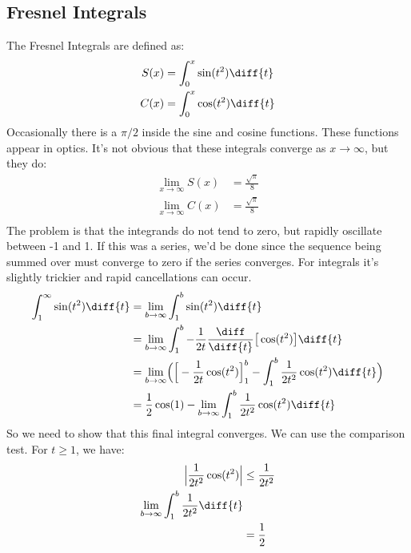         \subsection{Fresnel Integrals}
            The Fresnel Integrals are defined as:
            \begin{align}
                S(x)&=\int_{0}^{x}\sin(t^{2})\diff{t}\\
                C(x)&=\int_{0}^{x}\cos(t^{2})\diff{t}
            \end{align}
            Occasionally there is a $\pi/2$ inside the sine and
            cosine functions. These functions appear in optics.
            It's not obvious that these integrals converge as
            $x\rightarrow\infty$, but they do:
            \begin{align}
                \underset{x\rightarrow\infty}{\lim}S(x)
                &=\frac{\sqrt{\pi}}{8}\\
                \underset{x\rightarrow\infty}{\lim}C(x)
                &=\frac{\sqrt{\pi}}{8}\\
            \end{align}
            The problem is that the integrands do not tend to
            zero, but rapidly oscillate between -1 and 1. If this
            was a series, we'd be done since the sequence being
            summed over must converge to zero if the series
            converges. For integrals it's slightly trickier and
            rapid cancellations can occur.
            \begin{align}
                \int_{1}^{\infty}\sin(t^{2})\diff{t}
                &=\underset{b\rightarrow\infty}{\lim}
                \int_{1}^{b}\sin(t^{2})\diff{t}\\
                &=\underset{b\rightarrow\infty}{\lim}
                \int_{1}^{b}-\frac{1}{2t}\frac{\diff}{\diff{t}}
                \big[\cos(t^{2})\big]\diff{t}\\
                &=\underset{b\rightarrow\infty}{\lim}
                \Big(\Big[-\frac{1}{2t}\cos(t^{2})\Big]_{1}^{b}
                -\int_{1}^{b}\frac{1}{2t^{2}}\cos(t^{2})\diff{t}
                \Big)\\
                &=\frac{1}{2}\cos(1)-
                \underset{b\rightarrow\infty}{\lim}
                \int_{1}^{b}\frac{1}{2t^{2}}\cos(t^{2})\diff{t}
            \end{align}
            So we need to show that this final integral converges.
            We can use the comparison test. For $t\geq{1}$, we have:
            \begin{align}
                \Big|\frac{1}{2t^{2}}\cos(t^{2})\Big|&\leq
                \frac{1}{2t^{2}}\\
                \underset{b\rightarrow\infty}{\lim}
                \int_{1}^{b}\frac{1}{2t^{2}}\diff{t}\\
                &=\frac{1}{2}
            \end{align}
